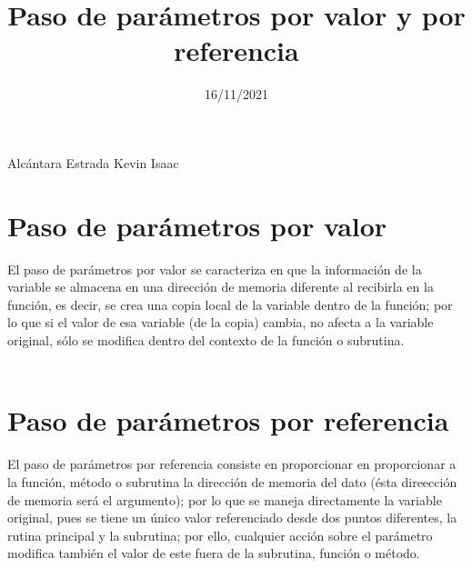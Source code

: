 \documentclass[20pt]{article}
\begin{document}
\title{Paso de parámetros por valor y por referencia}
\date{16/11/2021}
\maketitle

\setlength{\parindent}{0px}

Alcántara Estrada Kevin Isaac\\
\section{Paso de parámetros por valor}
        {\large El paso de parámetros por valor se caracteriza en que la información de la variable se almacena en una dirección de memoria diferente al recibirla en la función, es decir, se crea una copia local de la variable dentro de la función; por lo que si el valor de esa variable (de la copia) cambia, no afecta a la variable original, sólo se modifica dentro del contexto de la función o subrutina.}\\\\

        \section{Paso de parámetros por referencia}
{\large El paso de parámetros por referencia consiste en proporcionar en proporcionar a la función, método o subrutina la dirección de memoria del dato (ésta direección de memoria será el argumento); por lo que se maneja directamente la variable original, pues se tiene un único valor referenciado desde dos puntos diferentes, la rutina principal y la subrutina; por ello, cualquier acción sobre el parámetro modifica también el valor de este fuera de la subrutina, función o método.}\\\\
\end{document}
